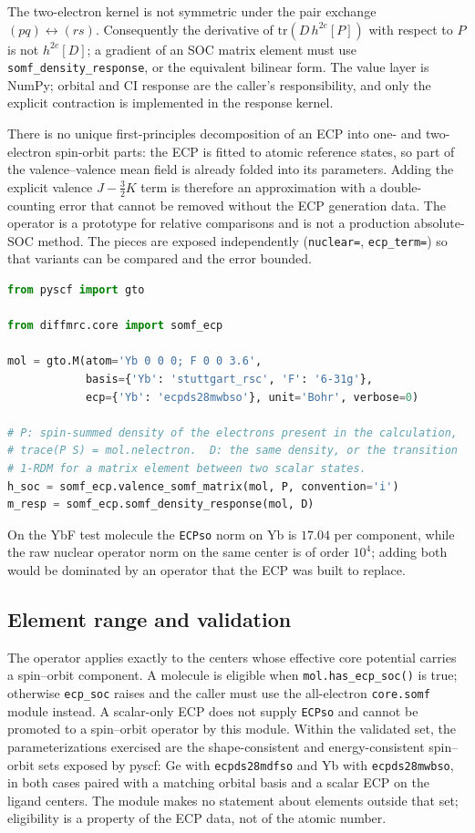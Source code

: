 The two-electron kernel is not symmetric under the pair exchange
$(pq) \leftrightarrow (rs)$.  Consequently the derivative of
$\mathrm{tr}(D\,h^{2e}[P])$ with respect to $P$ is not
$h^{2e}[D]$; a gradient of an SOC matrix element must use
\texttt{somf\_density\_response}, or the equivalent bilinear form.
The value layer is NumPy; orbital and CI response are the caller's
responsibility, and only the explicit contraction is implemented in the
response kernel.

There is no unique first-principles decomposition of an ECP into one-
and two-electron spin-orbit parts: the ECP is fitted to atomic
reference states, so part of the valence--valence mean field is already
folded into its parameters.  Adding the explicit valence
$J - \tfrac{3}{2}K$ term is therefore an approximation with a
double-counting error that cannot be removed without the ECP generation
data.  The operator is a prototype for relative comparisons and is not
a production absolute-SOC method.  The pieces are exposed independently
(\texttt{nuclear=}, \texttt{ecp\_term=}) so that variants can be
compared and the error bounded.

\begin{lstlisting}[language=Python]
from pyscf import gto

from diffmrc.core import somf_ecp

mol = gto.M(atom='Yb 0 0 0; F 0 0 3.6',
            basis={'Yb': 'stuttgart_rsc', 'F': '6-31g'},
            ecp={'Yb': 'ecpds28mwbso'}, unit='Bohr', verbose=0)

# P: spin-summed density of the electrons present in the calculation,
# trace(P S) = mol.nelectron.  D: the same density, or the transition
# 1-RDM for a matrix element between two scalar states.
h_soc = somf_ecp.valence_somf_matrix(mol, P, convention='i')
m_resp = somf_ecp.somf_density_response(mol, D)
\end{lstlisting}

On the YbF test molecule the \texttt{ECPso} norm on Yb is $17.04$ per
component, while the raw nuclear operator norm on the same center is of
order $10^{4}$; adding both would be dominated by an operator that the
ECP was built to replace.

\subsection{Element range and validation}

The operator applies exactly to the centers whose effective core
potential carries a spin--orbit component.  A molecule is eligible when
\texttt{mol.has\_ecp\_soc()} is true; otherwise \texttt{ecp\_soc}
raises and the caller must use the all-electron \texttt{core.somf}
module instead.  A scalar-only ECP does not supply \texttt{ECPso} and
cannot be promoted to a spin--orbit operator by this module.  Within
the validated set, the parameterizations exercised are the
shape-consistent and energy-consistent spin--orbit sets exposed by
pyscf: Ge with \texttt{ecpds28mdfso} and Yb with
\texttt{ecpds28mwbso}, in both cases paired with a matching orbital
basis and a scalar ECP on the ligand centers.  The module makes no
statement about elements outside that set; eligibility is a property of
the ECP data, not of the atomic number.

